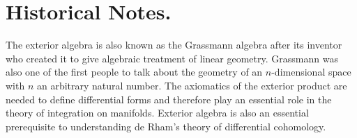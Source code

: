 \documentclass[12pt]{article}
\begin{document}
\section{Historical Notes.} The exterior algebra is also known as the Grassmann
algebra after its inventor 
who created it  to give algebraic treatment of linear
geometry.  Grassmann was also one of the first people to talk about
the geometry of an $n$-dimensional space with $n$ an arbitrary natural
number.  The axiomatics of the exterior product are needed to define
differential forms and therefore play an essential role in the theory
of integration on manifolds. Exterior algebra is also an essential
prerequisite to understanding de Rham's theory of differential
cohomology.
\end{document}

